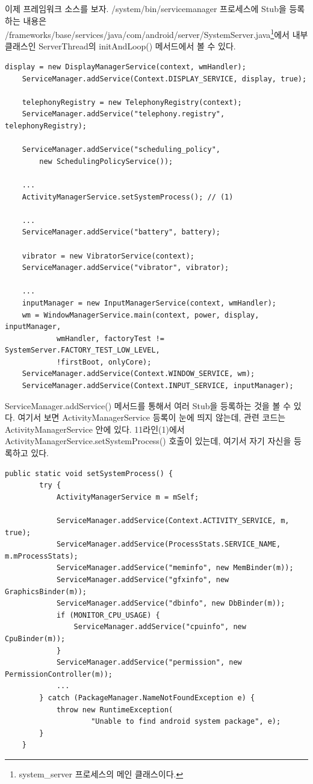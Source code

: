 이제 프레임워크 소스를 보자.
/system/bin/servicemanager 프로세스에 Stub을 등록하는 내용은 /frameworks/base/services/java/com/android/server/SystemServer.java\footnote{system\_server 프로세스의 메인 클래스이다.}에서 내부 클래스인 ServerThread의 initAndLoop() 메서드에서 볼 수 있다.

\begin{lstlisting}[frame=single, caption=SystemServer.java] 
	display = new DisplayManagerService(context, wmHandler);
	ServiceManager.addService(Context.DISPLAY_SERVICE, display, true);
	
	telephonyRegistry = new TelephonyRegistry(context);
	ServiceManager.addService("telephony.registry", telephonyRegistry);
	
	ServiceManager.addService("scheduling_policy", 
		new SchedulingPolicyService());
		
	...
	ActivityManagerService.setSystemProcess(); // (1)
		
	...
	ServiceManager.addService("battery", battery);
	
	vibrator = new VibratorService(context);
	ServiceManager.addService("vibrator", vibrator);
	
	...
	inputManager = new InputManagerService(context, wmHandler);
	wm = WindowManagerService.main(context, power, display, inputManager,
	        wmHandler, factoryTest != SystemServer.FACTORY_TEST_LOW_LEVEL,
	        !firstBoot, onlyCore);
	ServiceManager.addService(Context.WINDOW_SERVICE, wm);
	ServiceManager.addService(Context.INPUT_SERVICE, inputManager);
\end{lstlisting}	    
ServiceManager.addService() 메서드를 통해서 여러 Stub을 등록하는 것을 볼 수 있다.
여기서 보면 ActivityManagerService 등록이 눈에 띄지 않는데, 관련 코드는 ActivityManagerService 안에 있다. 
11라인(1)에서 ActivityManagerService.setSystemProcess() 호출이 있는데, 여기서 자기 자신을 등록하고 있다.
\begin{lstlisting}[frame=single, caption=ActivityManagerService.java] 
   public static void setSystemProcess() {
        try {
            ActivityManagerService m = mSelf;

            ServiceManager.addService(Context.ACTIVITY_SERVICE, m, true);
            ServiceManager.addService(ProcessStats.SERVICE_NAME, m.mProcessStats);
            ServiceManager.addService("meminfo", new MemBinder(m));
            ServiceManager.addService("gfxinfo", new GraphicsBinder(m));
            ServiceManager.addService("dbinfo", new DbBinder(m));
            if (MONITOR_CPU_USAGE) {
                ServiceManager.addService("cpuinfo", new CpuBinder(m));
            }
            ServiceManager.addService("permission", new PermissionController(m));
 			...
        } catch (PackageManager.NameNotFoundException e) {
            throw new RuntimeException(
                    "Unable to find android system package", e);
        }
    }
\end{lstlisting}	    


